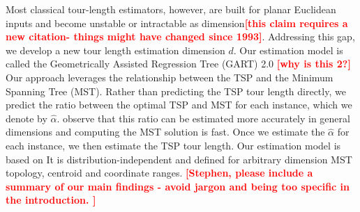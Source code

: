\documentclass{article}
\newcommand{\note}[1]{\textbf{\textcolor{red}{[#1]}}}
\begin{document}


 Most classical tour-length estimators, however, are built for planar Euclidean inputs and become unstable or intractable as dimension\note{this claim requires a new citation- things might have changed since 1993}. 
Addressing this gap, we develop a new tour length estimation dimension $d$.
 Our estimation model is called the Geometrically Assisted Regression Tree (GART) 2.0 \note{why is this 2?}
 Our approach leverages the relationship between the TSP and the Minimum Spanning Tree (MST).
 Rather than predicting the TSP tour length directly, we predict the ratio between the optimal TSP and MST for each instance, which we denote by $\hat{\alpha}$.
 observe that this ratio can be estimated more accurately in general dimensions and computing the MST solution is fast.
Once we estimate the $\hat{\alpha}$ for each instance, we then estimate the TSP tour length.
Our estimation model is based on %
It is distribution-independent and defined for arbitrary dimension MST topology, centroid and coordinate ranges. 
\note{Stephen, please include a summary of our main findings - avoid jargon and being too specific in the introduction. }
\end{document}
